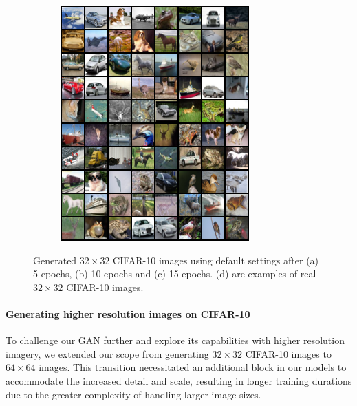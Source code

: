 \begin{figure}[H]
\begin{subfigure}{0.2\textwidth}
        \centering
        \includegraphics[width=0.95\linewidth]{cifar10/32/real_sample_epoch_0015.png}
        \caption{}
        \label{subfig:cifar10/32/real_sample_epoch_0015}
    \end{subfigure}%

    \caption{Generated $32 \times 32$ CIFAR-10 images using default settings after (a) 5 epochs, (b) 10 epochs and (c) 15 epochs. (d) are examples of real $32 \times 32$ CIFAR-10 images.}
    \label{fig:cifar10_32_images}
\end{figure}

\paragraph*{Generating higher resolution images on CIFAR-10}

To challenge our GAN further and explore its capabilities with higher resolution imagery, we extended our scope from generating $32 \times 32$ CIFAR-10 images to $64 \times 64$ images. This transition necessitated an additional block in our models to accommodate the increased detail and scale, resulting in longer training durations due to the greater complexity of handling larger image sizes.

